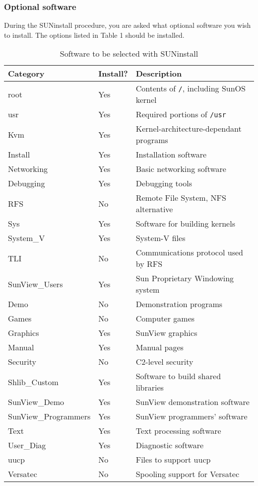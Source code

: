 \subsubsection{Optional software}

During the SUNinstall procedure, you are asked what optional software you 
wish to install. The options listed in Table 1 should be installed.

\begin{table}[htb]
\begin{center}
\begin{tabular}{||l|l|l||}
\hline
Category 		& Install? & Description\\
\hline
root			& Yes & Contents of {\tt /}, including SunOS kernel\\
usr			& Yes & Required portions of {\tt /usr}\\
Kvm			& Yes & Kernel-architecture-dependant programs\\
Install			& Yes & Installation software\\
Networking		& Yes & Basic networking software\\
Debugging		& Yes & Debugging tools\\
RFS                     & No  & Remote File System, NFS alternative\\
Sys                     & Yes & Software for building kernels\\
System\_V                & Yes & System-V files\\
TLI                     & No & Communications protocol used by RFS\\
SunView\_Users           & Yes & Sun Proprietary Windowing system\\
Demo                    & No & Demonstration programs\\
Games                   & No & Computer games\\
Graphics                & Yes & SunView graphics\\
Manual                  & Yes & Manual pages\\
Security                & No &  C2-level security\\
Shlib\_Custom            & Yes & Software to build shared libraries\\
SunView\_Demo            & Yes & SunView demonstration software\\
SunView\_Programmers     & Yes & SunView programmers' software\\
Text                    & Yes & Text processing software\\
User\_Diag               & Yes & Diagnostic software\\
uucp    		& No & Files to support uucp\\
Versatec                & No & Spooling support for Versatec\\
\hline
\end {tabular}
\caption{Software to be selected with SUNinstall}
\end{center}
\end {table}

